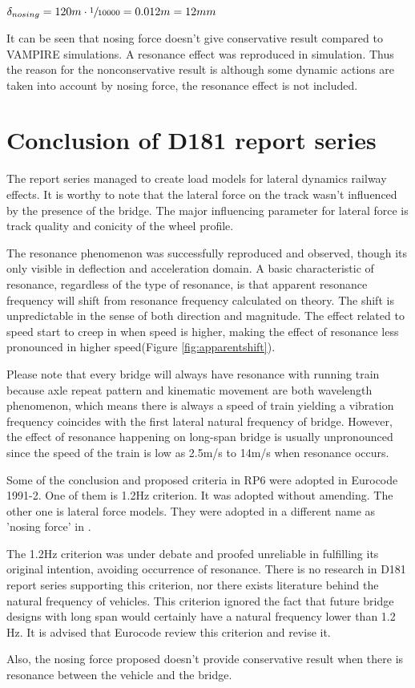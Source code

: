 $\delta_{nosing} = 120m \cdot \sfrac{1}{10000} = 0.012m = 12mm$

It can be seen that nosing force doesn't give conservative result compared to VAMPIRE simulations. A resonance effect was reproduced in simulation. Thus the  reason for the nonconservative result is although some dynamic actions are taken into account by nosing force, the resonance effect is not included.


\section{Conclusion of D181 report series}
The report series managed to create load models for lateral dynamics railway effects. It is worthy to note that the lateral force on the track wasn't influenced by the presence of the bridge. The major influencing parameter for lateral force is track quality and conicity of the wheel profile. 

The resonance phenomenon was successfully reproduced and observed, though its only visible in deflection and acceleration domain. A basic characteristic of resonance, regardless of the type of resonance, is that apparent resonance frequency will shift from resonance frequency calculated on theory. The shift is unpredictable in the sense of both direction and magnitude. The effect related to speed start to creep in when speed is higher, making the effect of resonance less pronounced in higher speed(Figure \ref{fig:apparentshift}). 

Please note that every bridge will always have resonance with running train because axle repeat pattern and kinematic movement are both wavelength phenomenon, which means there is always a speed of train yielding a vibration frequency coincides with the first lateral natural frequency of bridge. However, the effect of resonance happening on long-span bridge is usually unpronounced since the speed of the train is low as 2.5m/s to 14m/s when resonance occurs.  

Some of the conclusion and proposed criteria in RP6 were adopted in Eurocode 1991-2. One of them is 1.2Hz criterion. It was adopted without amending. The other one is lateral force models. They were adopted in a different name as 'nosing force' in \citet[A6.5.2]{EC12}. 

The 1.2Hz criterion was under debate and proofed unreliable in fulfilling its original intention, avoiding occurrence of resonance. There is no research in D181 report series supporting this criterion, nor there exists literature behind the natural frequency of vehicles. This criterion ignored the fact that future bridge designs with long span would certainly have a natural frequency lower than 1.2 Hz. It is advised that Eurocode review this criterion and revise it.

Also, the nosing force proposed doesn't provide conservative result when there is resonance between the vehicle and the bridge.

